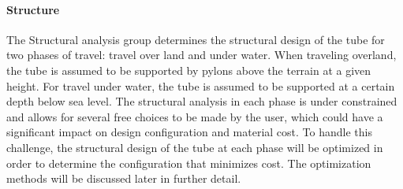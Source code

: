 \paragraph{Structure}
	The Structural analysis group determines the structural design of the tube for two phases of travel: travel over land and under water. When traveling overland, the tube is assumed to be supported by pylons above the terrain at a given height. For travel under water, the tube is assumed to be supported at a certain depth below sea level. The structural analysis in each phase is under constrained and allows for several free choices to be made by the user, which could have a significant impact on design configuration and material cost. To handle this challenge, the structural design of the tube at each phase will be optimized in order to determine the configuration that minimizes cost. The optimization methods will be discussed later in further detail.

